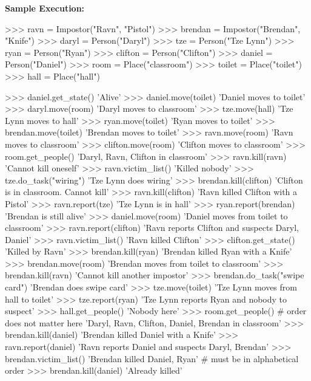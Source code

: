 \newpage
\textbf{Sample Execution:}
\begin{python}
>>> ravn = Impostor("Ravn", "Pistol")
>>> brendan = Impostor("Brendan", "Knife")
>>> daryl = Person("Daryl")
>>> tze = Person("Tze Lynn")
>>> ryan = Person("Ryan")
>>> clifton = Person("Clifton")
>>> daniel = Person("Daniel")
>>> room = Place("classroom")
>>> toilet = Place("toilet")
>>> hall = Place("hall")

>>> daniel.get_state()
'Alive'
>>> daniel.move(toilet)
'Daniel moves to toilet'
>>> daryl.move(room)
'Daryl moves to classroom'
>>> tze.move(hall)
'Tze Lynn moves to hall'
>>> ryan.move(toilet)
'Ryan moves to toilet'
>>> brendan.move(toilet)
'Brendan moves to toilet'
>>> ravn.move(room)
'Ravn moves to classroom'
>>> clifton.move(room)
'Clifton moves to classroom'
>>> room.get_people()
'Daryl, Ravn, Clifton in classroom'
>>> ravn.kill(ravn)
'Cannot kill oneself'
>>> ravn.victim_list()
'Killed nobody'
>>> tze.do_task("wiring")
'Tze Lynn does wiring'
>>> brendan.kill(clifton)
'Clifton is in classroom. Cannot kill'
>>> ravn.kill(clifton)
'Ravn killed Clifton with a Pistol'
>>> ravn.report(tze)
'Tze Lynn is in hall'
>>> ryan.report(brendan)
'Brendan is still alive'
>>> daniel.move(room)
'Daniel moves from toilet to classroom'
>>> ravn.report(clifton)
'Ravn reports Clifton and suspects Daryl, Daniel'
>>> ravn.victim_list()
'Ravn killed Clifton'
>>> clifton.get_state()
'Killed by Ravn'
>>> brendan.kill(ryan)
'Brendan killed Ryan with a Knife'
>>> brendan.move(room)
'Brendan moves from toilet to classroom'
>>> brendan.kill(ravn)
'Cannot kill another impostor'
>>> brendan.do_task("swipe card")
'Brendan does swipe card'
>>> tze.move(toilet)
'Tze Lynn moves from hall to toilet'
>>> tze.report(ryan)
'Tze Lynn reports Ryan and nobody to suspect'
>>> hall.get_people()
'Nobody here'
>>> room.get_people()    # order does not matter here
'Daryl, Ravn, Clifton, Daniel, Brendan in classroom'
>>> brendan.kill(daniel)
'Brendan killed Daniel with a Knife'
>>> ravn.report(daniel)
'Ravn reports Daniel and suspects Daryl, Brendan'
>>> brendan.victim_list()
'Brendan killed Daniel, Ryan'   # must be in alphabetical order
>>> brendan.kill(daniel)
'Already killed'
\end{python}

